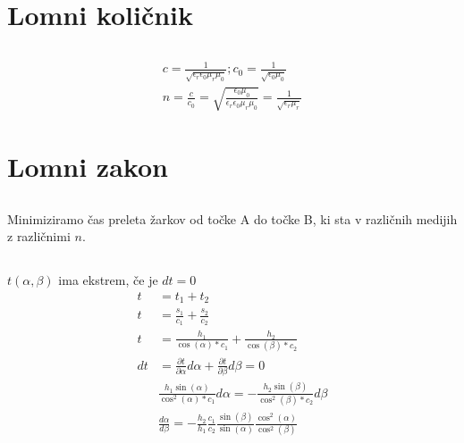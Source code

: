 \documentclass[a4paper,12pt]{article}
\begin{document}
\newpage

\section{Lomni količnik}
\subsection{}
\begin{align}
    c = \frac{1}{\sqrt{\epsilon_r \epsilon_0 \mu_r \mu_0}}; c_0 = \frac{1}{\sqrt{\epsilon_0\mu_0}} \\
    n = \frac{c}{c_0} = \sqrt{\frac{\epsilon_0\mu_0}{\epsilon_r \epsilon_0 \mu_r \mu_0}} = \frac{1}{\sqrt{\epsilon_r \mu_r}}
\end{align}

\newpage

\section{Lomni zakon} \label{sec:lomni_zakon}
\subsection{}
Minimiziramo čas preleta žarkov od točke A do točke B, ki sta v različnih medijih z različnimi $n$.

\subsection{}
$t(\alpha, \beta)$ ima ekstrem, če je $dt = 0$
\begin{align}
    t  & = t_1 + t_2                                                                                                                        \\
    t  & = \frac{s_1}{c_1} + \frac{s_2}{c_2}                                                                                                \\
    t  & = \frac{h_1}{\cos(\alpha) * c_1} + \frac{h_2}{\cos(\beta) * c_2}                                                                   \\
    dt & = \frac{\partial t}{\partial \alpha} d\alpha + \frac{\partial t}{\partial \beta} d\beta = 0                                        \\
       & \frac{h_1 \sin(\alpha)}{\cos^2(\alpha) * c_1} d\alpha = -\frac{h_2 \sin(\beta)}{\cos^2(\beta) * c_2} d\beta                        \\
       & \frac{d \alpha}{d \beta} = - \frac{h_2}{h_1} \frac{c_1}{c_2} \frac{\sin(\beta)}{\sin(\alpha)} \frac{\cos^2(\alpha)}{\cos^2(\beta)}
\end{align}
\end{document}
